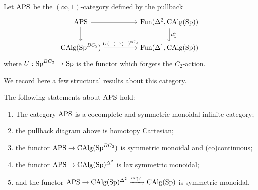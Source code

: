 \begin{definition}
Let $\mathrm{APS}$ be the $(\infty,1)$-category defined by the pullback \[
\begin{tikzcd}
\aps \arrow[rr]\arrow[d] & & \operatorname{Fun}(\Delta^2, \CAlg(\Spectra))\arrow[d,"d_1^*"]\\
\CAlg(\Spectra^{BC_2})\arrow[rr,"U(-)\to (-)^{tC_2}"] & & \operatorname{Fun}(\Delta^1, \CAlg(\Spectra))
\end{tikzcd}
\] where $U:\operatorname{Sp}^{BC_2}\to \operatorname{Sp}$ is the functor which forgets the $C_2$-action.
\end{definition}

We record here a few structural results about this category.

\begin{theorem}
The following statements about $\mathrm{APS}$ hold:
\begin{enumerate}
\item The category $\mathrm{APS}$ is a cocomplete and symmetric monoidal infinite category;
\item the pullback diagram above is homotopy Cartesian;
\item the functor $\mathrm{APS}\to \operatorname{CAlg}(\operatorname{Sp}^{BC_2})$ is symmetric monoidal and (co)continuous;
\item the functor $\mathrm{APS}\to \operatorname{CAlg}(\operatorname{Sp})^{\Delta^2}$ is lax symmetric monoidal;
\item and the functor $\mathrm{APS}\to \operatorname{CAlg}(\operatorname{Sp})^{\Delta^2}\xrightarrow{ev_{[1]}} \operatorname{CAlg}(\operatorname{Sp})$ is symmetric monoidal.
\end{enumerate}
\end{theorem}
